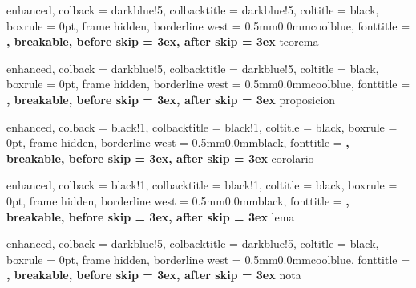 \makeatletter
{}
\makeatother

\renewcommand{\partname}{Parte}

\setlength{\parindent}{0pt}
\setlength{\parskip}{1ex}





%
    {enhanced,
    colback = darkblue!5,
    colbacktitle = darkblue!5,
    coltitle = black,
    boxrule = 0pt,
    frame hidden,
    borderline west = {0.5mm}{0.0mm}{coolblue},
    fonttitle = \bfseries\sffamily,
    breakable,
    before skip = 3ex,
    after skip = 3ex
}{teorema}

%
    {enhanced,
    colback = darkblue!5,
    colbacktitle = darkblue!5,
    coltitle = black,
    boxrule = 0pt,
    frame hidden,
    borderline west = {0.5mm}{0.0mm}{coolblue},
    fonttitle = \bfseries\sffamily,
    breakable,
    before skip = 3ex,
    after skip = 3ex
}{proposicion}

%
    {enhanced,
    colback = black!1,
    colbacktitle = black!1,
    coltitle = black,
    boxrule = 0pt,
    frame hidden,
    borderline west = {0.5mm}{0.0mm}{black},
    fonttitle = \bfseries\sffamily,
    breakable,
    before skip = 3ex,
    after skip = 3ex
}{corolario}

%
    {enhanced,
    colback = black!1,
    colbacktitle = black!1,
    coltitle = black,
    boxrule = 0pt,
    frame hidden,
    borderline west = {0.5mm}{0.0mm}{black},
    fonttitle = \bfseries\sffamily,
    breakable,
    before skip = 3ex,
    after skip = 3ex
}{lema}

%
    {enhanced,
    colback = darkblue!5,
    colbacktitle = darkblue!5,
    coltitle = black,
    boxrule = 0pt,
    frame hidden,
    borderline west = {0.5mm}{0.0mm}{coolblue},
    fonttitle = \bfseries\sffamily,
    breakable,
    before skip = 3ex,
    after skip = 3ex
}{nota}

